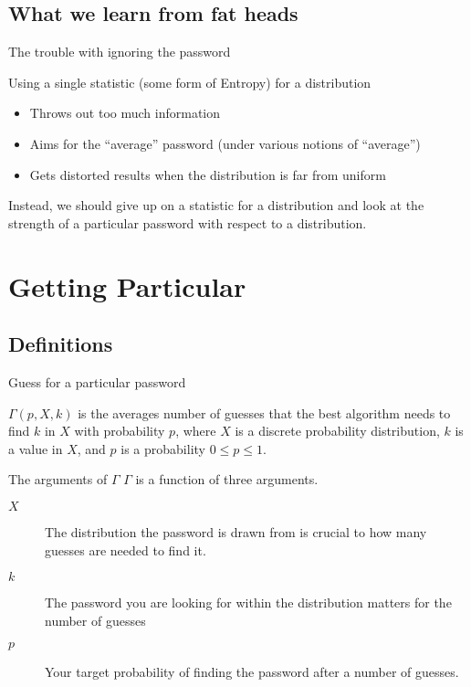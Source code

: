 \documentclass[xcolor={dvipsnames,table}]{beamer}
\newcommand\G{\ensuremath{\Gamma}}
\begin{document}
\subsection{What we learn from fat heads}

\begin{frame}{The trouble with ignoring the password}

Using a single statistic (some form of Entropy) for a distribution
\begin{itemize}
\item Throws out too much information
\item Aims for the ``average'' password (under various notions of ``average'')
\item Gets distorted results when the distribution is far from uniform
\end{itemize}
Instead, we should give up on a statistic for a distribution and look at the strength of a particular password with respect to a distribution.
\end{frame}

\section{Getting Particular}

\subsection{Definitions}

\begin{frame}{Guess for a particular password}
\begin{definition}[Guesses Function, \(\G\)] \label{def:calG}
$\G(p, X, k)$ is the averages number of guesses that the best algorithm needs to find $k$ in $X$ with probability $p$, where $X$ is a discrete probability distribution, $k$ is a value in $X$, and $p$ is a probability $0 \leq p \leq 1$.
\end{definition}
\end{frame}

\begin{frame}{The arguments of \(\G\)}
$\G$ is a function of three arguments.
\begin{description}
\item[$X$] The distribution the password is drawn from is crucial to how many guesses are needed to find it.
\item[$k$] The password you are looking for within the distribution matters for the number of guesses
\item[$p$] Your target probability of finding the password after a number of guesses.
\end{description}
\end{frame}
\end{document}
